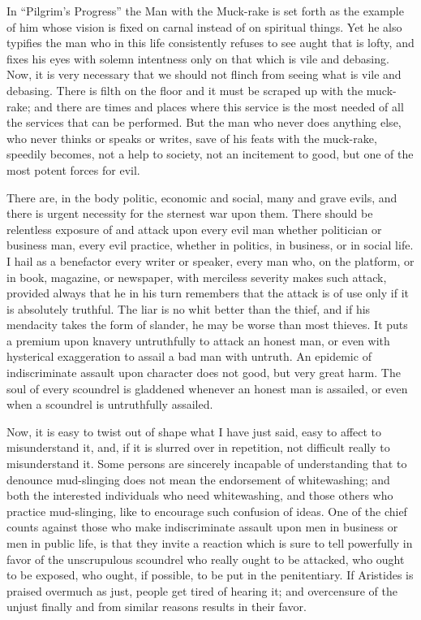 \documentclass[a4paper]{amsbook}
\begin{document}
In “Pilgrim's Progress” the Man with the Muck-rake is set forth as the example of him whose vision is fixed on carnal instead of on spiritual things. Yet he also typifies the man who in this life consistently refuses to see aught that is lofty, and fixes his eyes with solemn intentness only on that which is vile and debasing. Now, it is very necessary that we should not flinch from seeing what is vile and debasing. There is filth on the floor and it must be scraped up with the muck-rake; and there are times and places where this service is the most needed of all the services that can be performed. But the man who never does anything else, who never thinks or speaks or writes, save of his feats with the muck-rake, speedily becomes, not a help to society, not an incitement to good, but one of the most potent forces for evil.

There are, in the body politic, economic and social, many and grave evils, and there is urgent necessity for the sternest war upon them. There should be relentless exposure of and attack upon every evil man whether politician or business man, every evil practice, whether in politics, in business, or in social life. I hail as a benefactor every writer or speaker, every man who, on the platform, or in book, magazine, or newspaper, with merciless severity makes such attack, provided always that he in his turn remembers that the attack is of use only if it is absolutely truthful. The liar is no whit better than the thief, and if his mendacity takes the form of slander, he may be worse than most thieves. It puts a premium upon knavery untruthfully to attack an honest man, or even with hysterical exaggeration to assail a bad man with untruth. An epidemic of indiscriminate assault upon character does not good, but very great harm. The soul of every scoundrel is gladdened whenever an honest man is assailed, or even when a scoundrel is untruthfully assailed.

Now, it is easy to twist out of shape what I have just said, easy to affect to misunderstand it, and, if it is slurred over in repetition, not difficult really to misunderstand it. Some persons are sincerely incapable of understanding that to denounce mud-slinging does not mean the endorsement of whitewashing; and both the interested individuals who need whitewashing, and those others who practice mud-slinging, like to encourage such confusion of ideas. One of the chief counts against those who make indiscriminate assault upon men in business or men in public life, is that they invite a reaction which is sure to tell powerfully in favor of the unscrupulous scoundrel who really ought to be attacked, who ought to be exposed, who ought, if possible, to be put in the penitentiary. If Aristides is praised overmuch as just, people get tired of hearing it; and overcensure of the unjust finally and from similar reasons results in their favor.
\end{document}
